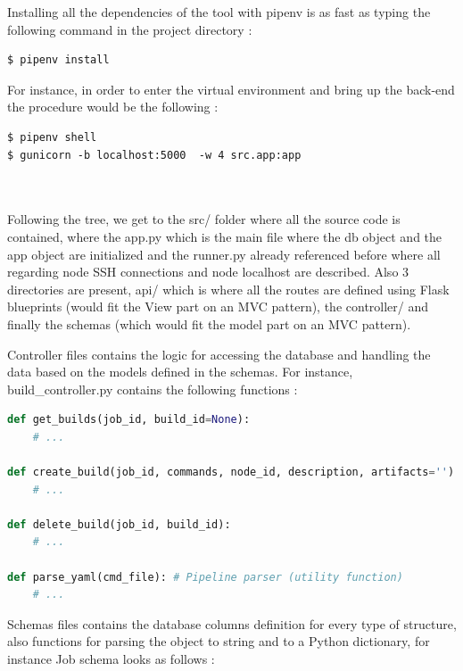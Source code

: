 \documentclass{article}
\begin{document}
Installing all the dependencies of the tool with pipenv is as fast as typing the following command in the project directory :

\begin{lstlisting}
$ pipenv install
\end{lstlisting}

For instance, in order to enter the virtual environment and bring up the back-end the procedure would be the following :

\begin{lstlisting}
$ pipenv shell
$ gunicorn -b localhost:5000  -w 4 src.app:app
\end{lstlisting}

~\\
~\\
\noindent
Following the tree, we get to the src/ folder where all the source code is contained, where the app.py which is the main file where the db object and the app object are initialized and the runner.py already referenced before where all regarding node SSH connections and node localhost are described. Also 3 directories are present, api/ which is where all the routes are defined using Flask blueprints (would fit the View part on an MVC pattern), the controller/ and finally the schemas (which would fit the model part on an MVC pattern).

Controller files contains the logic for accessing the database and handling the data based on the models defined in the schemas. For instance, build\_controller.py contains the following functions :

\begin{lstlisting}[language=Python]
def get_builds(job_id, build_id=None):
    # ...

def create_build(job_id, commands, node_id, description, artifacts=''):
    # ...

def delete_build(job_id, build_id):
    # ...

def parse_yaml(cmd_file): # Pipeline parser (utility function)
    # ... 
\end{lstlisting}

Schemas files contains the database columns definition for every type of structure, also functions for parsing the object to string and to a Python dictionary, for instance Job schema looks as follows :
\end{document}
